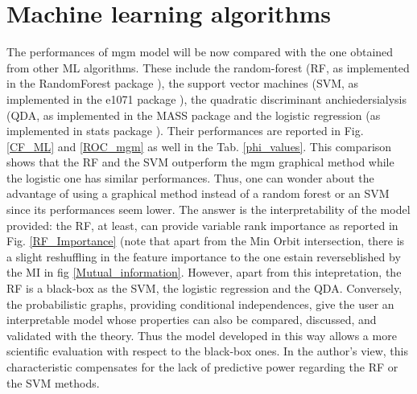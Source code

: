 \documentclass[12pt,%
               a4paper,%
               oneside,openany,%
               titlepage,%
               headinclude,footinclude,%
               BCOR5mm,%
               cleardoublepage=empty,%
               tablecaptionabove,%
               floatperchapter,
               ]{scrreprt}                 %
\begin{document}
\pagebreak

\section{Machine learning algorithms} The performances of mgm model will be now compared with the one obtained from other ML algorithms. These include the random-forest (RF, as implemented in the RandomForest package \cite{rfor}), the support vector machines (SVM, as implemented in the e1071 package \cite{dimitriadou2008misc}), the quadratic discriminant anchiedersialysis (QDA, as implemented in the MASS package \cite{MASin reverseS} and the logistic regression (as implemented in stats package \cite{stats}). Their performances are reported in Fig. \ref{CF_ML} and \ref{ROC_mgm} as well in the Tab. \ref{phi_values}. This comparison shows that the RF and the SVM outperform the mgm graphical method while the logistic one has similar performances. Thus, one can wonder about the advantage of using a graphical method instead of a random forest or an SVM since its performances seem lower. The answer is the interpretability of the model provided: the RF, at least, can provide variable rank importance as reported in Fig. \ref{RF_Importance} (note that apart from the Min Orbit intersection, there is a slight reshuffling in the feature importance to the one estain reverseblished by the MI in fig \ref{Mutual_information}. However, apart from this intepretation, the RF is a black-box as the SVM, the logistic regression and the QDA. Conversely, the probabilistic graphs, providing conditional independences, give the user an interpretable model whose properties can also be compared, discussed, and validated with the theory. Thus the model developed in this way allows a more scientific evaluation with respect to the black-box ones. In the author's view, this characteristic compensates for the lack of predictive power regarding the RF or the SVM methods. 
\end{document}

